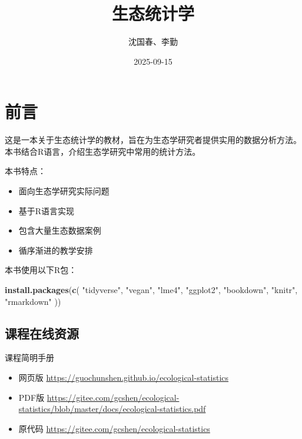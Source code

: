 \documentclass[
]{book}
\title{生态统计学}
\author{沈国春、李勤}
\date{2025-09-15}
\newenvironment{Shaded}{\begin{snugshade}}{\end{snugshade}}
\newcommand{\FunctionTok}[1]{\textcolor[rgb]{0.13,0.29,0.53}{\textbf{#1}}}
\newcommand{\NormalTok}[1]{#1}
\newcommand{\StringTok}[1]{\textcolor[rgb]{0.31,0.60,0.02}{#1}}
\providecommand{\tightlist}{%
  \setlength{\itemsep}{0pt}\setlength{\parskip}{0pt}}
\begin{document}
\maketitle

{
\setcounter{tocdepth}{1}
\tableofcontents
}
\hypertarget{ux524dux8a00}{%
\chapter*{前言}\label{ux524dux8a00}}

这是一本关于生态统计学的教材，旨在为生态学研究者提供实用的数据分析方法。本书结合R语言，介绍生态学研究中常用的统计方法。

本书特点：

\begin{itemize}
\tightlist
\item
  面向生态学研究实际问题
\item
  基于R语言实现
\item
  包含大量生态数据案例
\item
  循序渐进的教学安排
\end{itemize}

本书使用以下R包：

\begin{Shaded}
\begin{Highlighting}[]
\FunctionTok{install.packages}\NormalTok{(}\FunctionTok{c}\NormalTok{(}
  \StringTok{"tidyverse"}\NormalTok{, }\StringTok{"vegan"}\NormalTok{, }\StringTok{"lme4"}\NormalTok{, }\StringTok{"ggplot2"}\NormalTok{, }
  \StringTok{"bookdown"}\NormalTok{, }\StringTok{"knitr"}\NormalTok{, }\StringTok{"rmarkdown"}
\NormalTok{))}
\end{Highlighting}
\end{Shaded}

\hypertarget{ux8bfeux7a0bux5728ux7ebfux8d44ux6e90}{%
\section{课程在线资源}\label{ux8bfeux7a0bux5728ux7ebfux8d44ux6e90}}

课程简明手册

\begin{itemize}
\tightlist
\item
  网页版 \url{https://guochunshen.github.io/ecological-statistics}
\item
  PDF版 \url{https://gitee.com/gcshen/ecological-statistics/blob/master/docs/ecological-statistics.pdf}
\item
  原代码 \url{https://gitee.com/gcshen/ecological-statistics}
\end{itemize}
\end{document}
